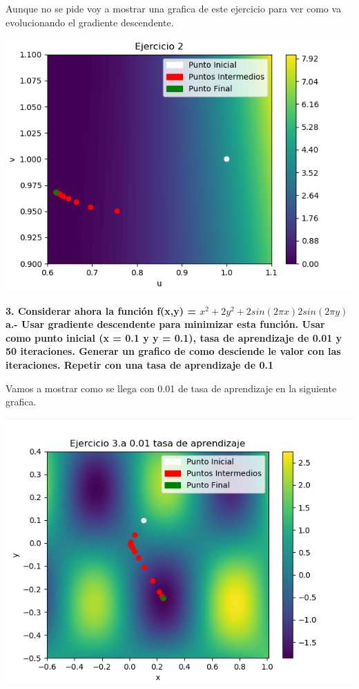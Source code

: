 \documentclass[titlepage]{article}
\begin{document}
	Aunque no se pide voy a mostrar una grafica de este ejercicio para ver como va evolucionando el gradiente descendente.
	
	\begin{center}
		\includegraphics[scale=0.75]{ejercicio2.png}
	\end{center}

	
	\textbf{3. Considerar ahora la función f(x,y) = $x^2 + 2y^2 +2sin(2\pi x)2sin(2\pi y)$}
	\newline
	\textbf{a.- Usar gradiente descendente para minimizar esta función. Usar como punto inicial (x = 0.1 y y = 0.1), tasa de aprendizaje de 0.01 y 50 iteraciones. Generar un grafico de como desciende le valor con las iteraciones. Repetir con una tasa de aprendizaje de 0.1}
	\newline
	
	Vamos a mostrar como se llega con 0.01 de tasa de aprendizaje en la siguiente grafica.
	\newline
	\begin{center}
		\includegraphics[scale=0.75]{3_1.png}
	\end{center}
\end{document}
